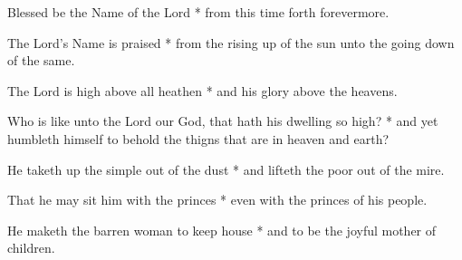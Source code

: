 Blessed be the Name of the Lord * from this time forth forevermore.
	
The Lord's Name is praised * from the rising up of the sun unto the going down of the same.
	
The Lord is high above all heathen * and his glory above the heavens.
	
Who is like unto the Lord our God, that hath his dwelling so high? * and yet humbleth himself to behold the thigns that are in heaven and earth?
	
He taketh up the simple out of the dust * and lifteth the poor out of the mire.
	
That he may sit him with the princes * even with the princes of his people.
	
He maketh the barren woman to keep house * and to be the joyful mother of children.